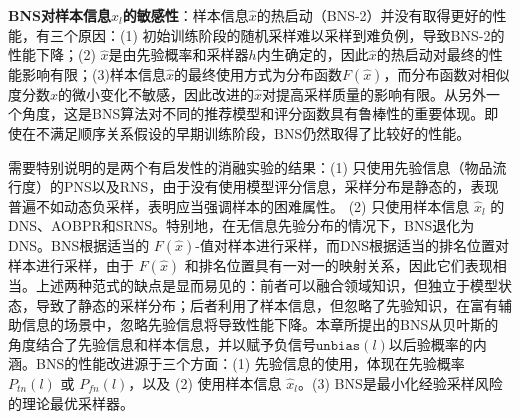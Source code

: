 \textbf{BNS对样本信息$\hat{x}_l$的敏感性}：样本信息$\hat{x}$的热启动（BNS-2）并没有取得更好的性能，有三个原因：(1) 初始训练阶段的随机采样难以采样到难负例，导致BNS-2的性能下降；(2) $\hat{x}$是由先验概率和采样器$h$内生确定的，因此$\hat{x}$的热启动对最终的性能影响有限；(3)样本信息$\hat{x}$的最终使用方式为分布函数$F(\hat{x})$，而分布函数对相似度分数$\hat{x}$的微小变化不敏感，因此改进的$\hat{x}$对提高采样质量的影响有限。从另外一个角度，这是BNS算法对不同的推荐模型和评分函数具有鲁棒性的重要体现。即使在不满足顺序关系假设的早期训练阶段，BNS仍然取得了比较好的性能。

需要特别说明的是两个有启发性的消融实验的结果：(1) 只使用先验信息（物品流行度）的PNS以及RNS，由于没有使用模型评分信息，采样分布是静态的，表现普遍不如动态负采样，表明应当强调样本的困难属性。 (2) 只使用样本信息 $\hat{x}_l$ 的DNS、AOBPR和SRNS。特别地，在无信息先验分布的情况下，BNS退化为DNS。BNS根据适当的 $F(\hat{x})$-值对样本进行采样，而DNS根据适当的排名位置对样本进行采样，由于 $F(\hat{x})$ 和排名位置具有一对一的映射关系，因此它们表现相当。上述两种范式的缺点是显而易见的：前者可以融合领域知识，但独立于模型状态，导致了静态的采样分布；后者利用了样本信息，但忽略了先验知识，在富有辅助信息的场景中，忽略先验信息将导致性能下降。本章所提出的BNS从贝叶斯的角度结合了先验信息和样本信息，并以赋予负信号$\mathtt{unbias}(l)$以后验概率的内涵。BNS的性能改进源于三个方面：(1) 先验信息的使用，体现在先验概率 $P_{tn}(l)$ 或 $P_{fn}(l)$，以及 (2) 使用样本信息 $\hat{x}_l$。(3) BNS是最小化经验采样风险的理论最优采样器。

